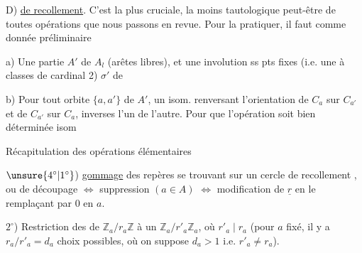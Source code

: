 D) \uline{ de recollement}. C'est la plus cruciale, la moins tautologique peut-être de toutes  opérations que nous passons en revue.
Pour la pratiquer, il faut comme donnée préliminaire

a) Une partie  $A'$ de $A_l$ (arêtes libres), et une involution ss pts fixes (i.e. une   à classes de cardinal 2) $\sigma'$ de  

b) Pour  tout orbite  $\{a,a'\}$ de $A'$, un isom. renversant l'orientation de $C_a$ sur $C_{a'}$ et de $C_{a'}$ sur $C_a$, inverses l'un de l'autre.
Pour que l'opération soit bien déterminée  isom 

Récapitulation des opérations élémentaires


$\unsure{4^\circ|1^\circ}$) \uline{gommage}  des repères se trouvant sur un cercle  de recollement , ou  de découpage
$\Longleftrightarrow$ suppression   
$(a\in A)$ $\Longleftrightarrow$ modification de $\underline r$ en le
remplaçant par $0$ en $a$.

$2^\circ$) 
Restriction des   de $\mathbb Z_a/r_a\mathbb Z$ à un
$\mathbb Z_a/r'_a\mathbb Z_a$, où $r'_a\mid r_a$ 
(pour $a$ fixé, il y a $r_a/r'_a=d_a$ choix possibles, où on suppose $d_a>1$ i.e. $r'_a\ne r_a$).

